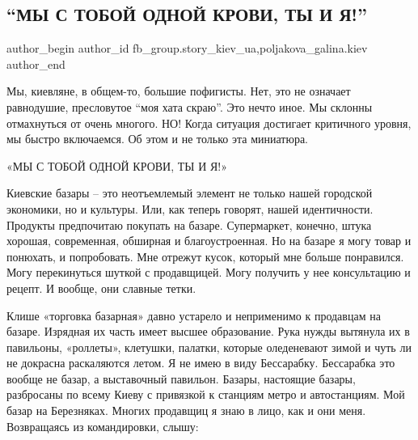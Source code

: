  
 
 
 
 
 
\subsection{\enquote{МЫ С ТОБОЙ ОДНОЙ КРОВИ, ТЫ И Я!}}
\label{sec:27_12_2021.fb.fb_group.story_kiev_ua.1.odnoj_krovi_ty_i_ja}
 
\ifcmt
 author_begin
   author_id fb_group.story_kiev_ua,poljakova_galina.kiev
 author_end
\fi

Мы, киевляне, в общем-то, большие пофигисты. Нет, это не означает равнодушие,
пресловутое \enquote{моя хата скраю}. Это нечто иное. Мы склонны отмахнуться от очень
многого. НО! Когда ситуация достигает критичного уровня, мы быстро включаемся.
Об этом и не только эта миниатюра. 

«МЫ С ТОБОЙ ОДНОЙ КРОВИ, ТЫ И Я!»

Киевские базары – это неотъемлемый элемент не только нашей городской экономики,
но и культуры. Или, как теперь говорят, нашей идентичности. Продукты
предпочитаю покупать на базаре. Супермаркет, конечно, штука хорошая,
современная, обширная и благоустроенная. Но на базаре я могу товар и понюхать,
и попробовать. Мне отрежут кусок, который мне больше понравился. Могу
перекинуться шуткой с продавщицей. Могу получить у нее консультацию и рецепт. И
вообще, они славные тетки. 

Клише «торговка базарная» давно устарело и неприменимо к продавцам на базаре.
Изрядная их часть имеет высшее образование. Рука нужды вытянула их в павильоны,
«роллеты», клетушки, палатки, которые оледеневают зимой и чуть ли не докрасна
раскаляются летом. Я не имею в виду Бессарабку. Бессарабка это вообще не базар,
а выставочный павильон. Базары, настоящие базары, разбросаны по всему Киеву с
привязкой к станциям метро и автостанциям. Мой базар на Березняках. Многих
продавщиц я знаю в лицо, как и они меня. Возвращаясь из командировки, слышу:

